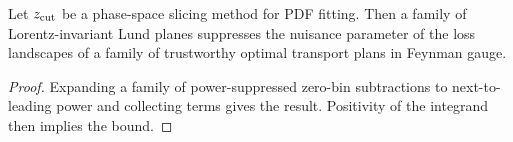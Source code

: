 \begin{corollary}\label{thm:3}
Let $z_{\rm cut}$ be a phase-space slicing method for PDF fitting. Then
a family of Lorentz-invariant Lund planes suppresses the nuisance
parameter of the loss landscapes of a family of trustworthy optimal
transport plans in Feynman gauge.
\end{corollary}

\begin{proof}
Expanding a family of power-suppressed zero-bin subtractions to
next-to-leading power and collecting terms gives the result. Positivity
of the integrand then implies the bound.
\end{proof}

